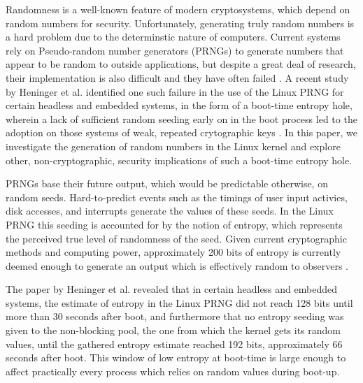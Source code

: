 Randomness is a well-known feature of modern cryptosystems, which depend on random numbers for security.  Unfortunately, generating truly random numbers is a hard problem due to the determinstic nature of computers.  Current systems rely on Pseudo-random number generators (PRNGs) to generate numbers that appear to be random to outside applications, but despite a great deal of research, their implementation is also difficult and they have often failed \cite{linuxPRNG, yilek, netscape, poker, java_sessid, bellare_dss, chor_bits, windows}. A recent study by Heninger et al. identified one such failure in the use of the Linux PRNG for certain headless and embedded systems, in the form of a boot-time entropy hole, wherein a lack of sufficient random seeding early on in the boot process led to the adoption on those systems of weak, repeated crytographic keys \cite{pnqs}.  In this paper, we investigate the generation of random numbers in the Linux kernel and explore other, non-cryptographic, security implications of such a boot-time entropy hole.  

PRNGs base their future output, which would be predictable otherwise, on random seeds.  Hard-to-predict events such as the timings of user input activies, disk accesses, and interrupts generate the values of these seeds\cite{disk_timing}. In the Linux PRNG this seeding is accounted for by the notion of entropy, which represents the perceived true level of randomness of the seed.  Given current cryptographic methods and computing power, approximately 200 bits of entropy is currently deemed enough to generate an output which is effectively random to observers \cite{tcp_RFC}.  

The paper by Heninger et al. revealed that in certain headless and embedded systems, the estimate of entropy in the Linux PRNG did not reach 128 bits until more than 30 seconds after boot, and furthermore that no entropy seeding was given to the non-blocking pool, the one from which the kernel gets its random values, until the gathered entropy estimate reached 192 bits, approximately 66 seconds after boot.  This window of low entropy at boot-time is large enough to affect practically every process which relies on random values during boot-up.  

